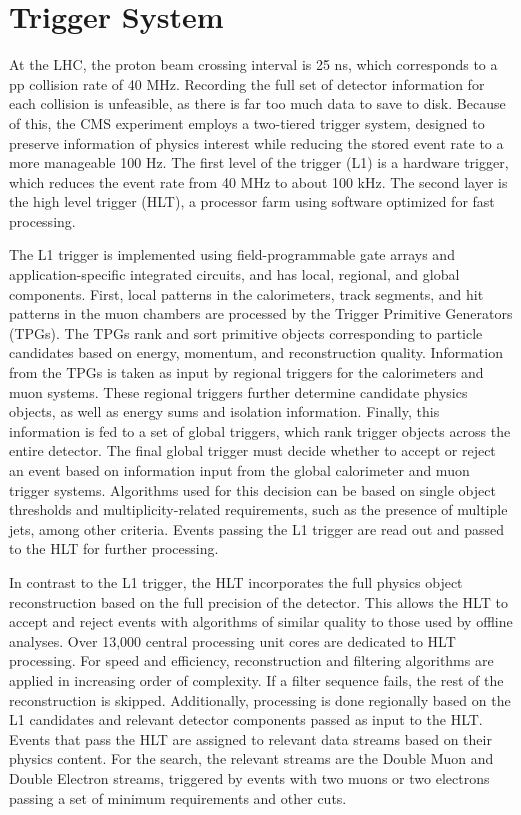 \section{Trigger System}
At the LHC, the proton beam crossing interval is 25 ns, which corresponds to a pp collision rate of 40 MHz. Recording the full set of detector information for each collision is unfeasible, as there is far too much data to save to disk. Because of this, the CMS experiment employs a two-tiered trigger system, designed to preserve information of physics interest while reducing the 
stored event rate to a more manageable 100 Hz. The first level of the trigger (L1) is a hardware trigger, which reduces the event rate from 40 MHz to about 100 kHz. The second layer is the 
high level trigger (HLT), a processor farm using software optimized for fast processing. 

The L1 trigger is implemented using field-programmable gate arrays and application-specific integrated circuits, and has local, regional, and global components. First, local patterns in the calorimeters, track segments, and hit patterns in the muon chambers 
are processed by the Trigger Primitive Generators (TPGs). The TPGs rank and sort primitive objects corresponding to particle candidates based on energy, momentum, and reconstruction quality. Information
from the TPGs is taken as input by regional triggers for the calorimeters and muon systems. These regional triggers further determine candidate physics objects, as well as energy sums and isolation
information. Finally, this information is fed to a set of global triggers, which rank trigger objects across the entire detector. The final global trigger must decide whether to accept or 
reject an event based on information input from the global calorimeter and muon trigger systems. Algorithms used for this decision can be based on single object \pt thresholds and multiplicity-related 
requirements, such as the presence of multiple jets, among other criteria. Events passing the L1 trigger are read out and passed to the HLT for further processing. 

In contrast to the L1 trigger, the HLT incorporates the full physics object reconstruction based on the full precision of the detector. This allows the HLT to accept and reject events with algorithms 
of similar quality to those used by offline analyses. Over 13,000 central processing unit cores are dedicated to HLT processing. For speed and efficiency, reconstruction and filtering algorithms are applied in increasing order of complexity. If a filter sequence fails, the rest of the reconstruction is skipped. Additionally, processing is done regionally based on the L1 candidates and relevant detector components 
passed as input to the HLT. Events that pass the HLT are assigned to relevant data streams based on their physics content. For the \hzg{} search, the relevant streams are the Double Muon and 
Double Electron streams, triggered by events with two muons or two electrons passing a set of minimum \pt requirements and other cuts. 

